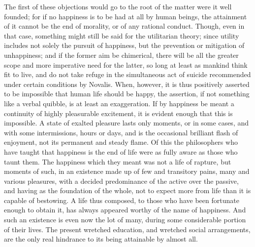 \documentclass[12pt]{report}
\begin{document}
The first of these objections would go to the root of the matter were it well founded; for if no happiness is to be had at all by human beings, the attainment of it cannot be the end of morality, or of any rational conduct. Though, even in that case, something might still be said for the utilitarian theory; since utility includes not solely the pursuit of happiness, but the prevention or mitigation of unhappiness; and if the former aim be chimerical, there will be all the greater scope and more imperative need for the latter, so long at least as mankind think fit to live, and do not take refuge in the simultaneous act of suicide recommended under certain conditions by Novalis. When, however, it is thus positively asserted to be impossible that human life should be happy, the assertion, if not something like a verbal quibble, is at least an exaggeration. If by happiness be meant a continuity of highly pleasurable excitement, it is evident enough that this is impossible. A state of exalted pleasure lasts only moments, or in some cases, and with some intermissions, hours or days, and is the occasional brilliant flash of enjoyment, not its permanent and steady flame. Of this the philosophers who have taught that happiness is the end of life were as fully aware as those who taunt them. The happiness which they meant was not a life of rapture, but moments of such, in an existence made up of few and transitory pains, many and various pleasures, with a decided predominance of the active over the passive, and having as the foundation of the whole, not to expect more from life than it is capable of bestowing. A life thus composed, to those who have been fortunate enough to obtain it, has always appeared worthy of the name of happiness. And such an existence is even now the lot of many, during some considerable portion of their lives. The present wretched education, and wretched social arrangements, are the only real hindrance to its being attainable by almost all.
\end{document}
